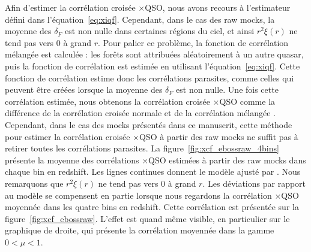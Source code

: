 Afin d'estimer la corrélation croisée \lya{}$\times$QSO, nous avons recours à l'estimateur défini dans l'équation~\ref{eq:xiqf}.
Cependant, dans le cas des raw mocks, la moyenne des $\delta_F$ est non nulle dans certaines régions du ciel, et ainsi $r^2\xi(r)$ ne tend pas vers 0 à grand $r$.
Pour palier ce problème, la fonction de corrélation \og mélangée \fg est calculée : les forêts sont attribuées aléatoirement à un autre quasar, puis la fonction de corrélation est estimée en utilisant l'équation~\ref{eq:xiqf}.
Cette fonction de corrélation estime donc les corrélations parasites, comme celles qui peuvent être créées lorsque la moyenne des $\delta_F$ est non nulle.
Une fois cette corrélation estimée, nous obtenons la corrélation croisée \lya{}$\times$QSO comme la différence de la corrélation croisée \og normale \fg et de la corrélation \og mélangée \fg.
Cependant, dans le cas des mocks présentés dans ce manuscrit, cette méthode pour estimer la corrélation croisée \lya{}$\times$QSO à partir des raw mocks ne suffit pas à retirer toutes les corrélations parasites.
La figure~\ref{fig:xcf_ebossraw_4bins} présente la moyenne des \Nmocks{} corrélations \lya{}$\times$QSO estimées à partir des raw mocks dans  chaque bin en redshift. Les lignes continues donnent le modèle ajusté par \picca{}. Nous remarquons que $r^2\xi(r)$ ne tend pas vers 0 à grand $r$.
Les déviations par rapport au modèle se compensent en partie lorsque nous regardons la corrélation \lya{}$\times$QSO moyennée dans les quatre bins en redshift. Cette corrélation est présentée sur la figure~\ref{fig:xcf_ebossraw}. L'effet est quand même visible, en particulier sur le graphique de droite, qui présente la corrélation moyennée dans la gamme $0 < \mu < 1$.

